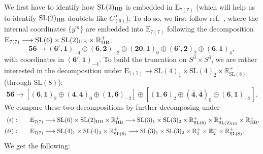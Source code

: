 \documentclass[11pt]{article}
\newcommand{\SL}{\ensuremath{\mathrm{SL}}\xspace}
\newcommand{\E}{\ensuremath{\mathrm{E}}\xspace}
\newcommand{\R}{\ensuremath{\mathbb{R}}\xspace}
\begin{document}
  We first have to identify how $\SL(2)_{\rm IIB}$ is embedded in $\E_{7(7)}$ (which will help us to identify $\SL(2)_{\rm IIB}$ doublets like $C_{(6)}^{\alpha}$). To do so, we first follow ref.~\cite{Inverso:2016eet}, where the internal coordinates $\{y^{m}\}$ are embedded into $\E_{7(7)}$ following the decomposition $\E_{7(7)}\longrightarrow\SL(6)\times\SL(2)_{\rm IIB}\times\R^{+}_{\rm IIB}$:
  \begin{equation}
    \bm{56} \rightarrow (\bm{6'},\bm{1})_{-4} \oplus (\bm{6},\bm{2})_{-2} \oplus (\bm{20},\bm{1})_{0} \oplus (\bm{6'},\bm{2})_{2} \oplus (\bm{6},\bm{1})_{4},
  \end{equation}
  with coordinates in $(\bm{6'},\bm{1})_{-4}$. To build the truncation on $S^{3}\times S^{3}$, we are rather interested in the decomposition under $\E_{7(7)}\longrightarrow\SL(4)_{1}\times\SL(4)_{2}\times\R^{+}_{\SL(8)}$ (through $\SL(8)$):
  \begin{equation}
    \bm{56} \rightarrow \left[(\bm{6},\bm{1})_{2} \oplus (\bm{4},\bm{4})_{0} \oplus (\bm{1},\bm{6})_{-2}\right] \oplus \left[(\bm{1},\bm{6})_{2} \oplus (\bm{\bar{4}},\bm{\bar{4}})_{0} \oplus (\bm{6},\bm{1})_{-2}\right].
  \end{equation}
  We compare these two decompositions by further decomposing under
  \begin{equation}
    \begin{aligned}
     (i):&\qquad \E_{7(7)}\longrightarrow\SL(6)\times\SL(2)_{\rm IIB}\times\R^{+}_{\rm IIB} \longrightarrow \SL(3)_{1}\times\SL(3)_{2}\times\R^{+}_{\SL(6)}\times\R^{+}_{\SL(2)_{\rm IIB}}\times\R^{+}_{\rm IIB},\\
     (ii):&\qquad \E_{7(7)}\longrightarrow\SL(4)_{1}\times\SL(4)_{2}\times\R^{+}_{\SL(8)} \longrightarrow \SL(3)_{1}\times\SL(3)_{2}\times\R^{+}_{1}\times\R^{+}_{2}\times\R^{+}_{\SL(8)}.
    \end{aligned}
  \end{equation}
  We get the following:
\end{document}
